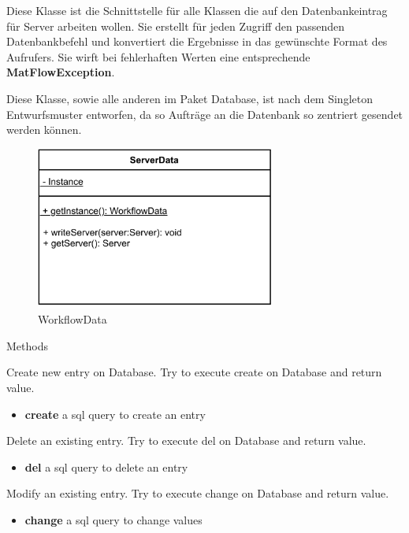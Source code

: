 Diese Klasse ist die Schnittstelle für alle Klassen die auf den Datenbankeintrag für Server arbeiten wollen. Sie erstellt für jeden Zugriff den passenden Datenbankbefehl und konvertiert die Ergebnisse in das gewünschte Format des Aufrufers.
Sie wirft bei fehlerhaften Werten eine entsprechende \textbf{MatFlowException}.

Diese Klasse, sowie alle anderen im Paket Database, ist nach dem Singleton Entwurfsmuster entworfen, da so Aufträge an die Datenbank so zentriert gesendet werden können.
\begin{figure}[h]
	\centering
	\includegraphics[width=0.7\textwidth]{res/Klassen/ServerData.pdf} 
	\caption{WorkflowData}
	\label{fig:workflowDataClass}
\end{figure}

\begin{methodenv}{Methods}
	
 Create new entry on Database. Try to execute create on Database and return value.

\begin{itemize}
	\item \textbf{create} 
	a sql query to create an entry
\end{itemize}

 Delete an existing entry. Try to execute del on Database and return value.

\begin{itemize}
	\item \textbf{del} 
	a sql query to delete an entry
\end{itemize}

 Modify an existing entry. Try to execute change on Database and return value.

\begin{itemize}
	\item \textbf{change} 
	a sql query to change values
\end{itemize}

\end{methodenv}

